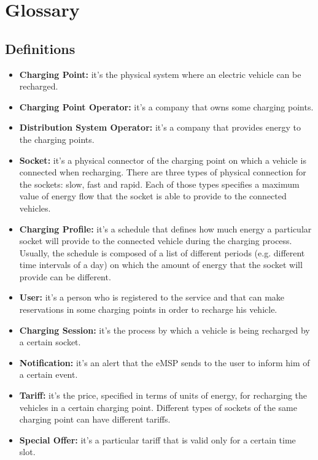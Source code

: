 \documentclass{Configuration_Files/PoliMi3i_thesis}
\begin{document}
\section{Glossary}

\subsection{Definitions}

\begin{itemize}
    \item \textbf{Charging Point:} it's the physical system where an electric vehicle can be recharged.
    \item \textbf{Charging Point Operator:} it's a company that owns some charging points.
    \item \textbf{Distribution System Operator:} it's a company that provides energy to the charging points.
    \item \textbf{Socket:} it's a physical connector of the charging point on which a vehicle is connected when recharging. There are three types of physical connection for the sockets: slow, fast and rapid. Each of those types specifies a maximum value of energy flow that the socket is able to provide to the connected vehicles.
    \item \textbf{Charging Profile:} it's a schedule that defines how much energy a particular socket will provide to the connected vehicle during the charging process. Usually, the schedule is composed of a list of different periods (e.g. different time intervals of a day) on which the amount of energy that the socket will provide can be different.
    \item \textbf{User:} it's a person who is registered to the service and that can make reservations in some charging points in order to recharge his vehicle.
    \item \textbf{Charging Session:} it's the process by which a vehicle is being recharged by a certain socket.
    \item \textbf{Notification:} it's an alert that the eMSP sends to the user to inform him of a certain event.
    \item \textbf{Tariff:} it's the price, specified in terms of units of energy, for recharging the vehicles in a certain charging point. Different types of sockets of the same charging point can have different tariffs.
    \item \textbf{Special Offer:} it's a particular tariff that is valid only for a certain time slot.

\end{itemize}
\end{document}
